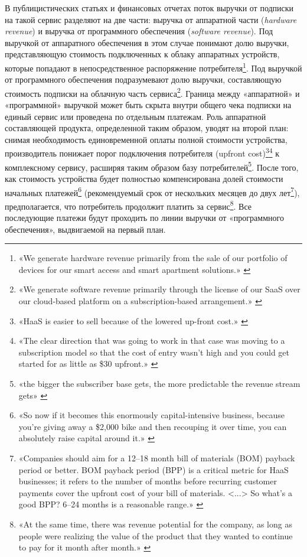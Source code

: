 \documentclass{article}
\let\textitorig\textit
\renewcommand{\textit}[1]{{\fontfamily{cmr}\selectfont \textitorig{#1}}}
\begin{document}
В публицистических статьях и финансовых отчетах поток выручки от подписки на такой сервис разделяют на две части: выручка от аппаратной части (\textit{hardware revenue}) и выручка от программного обеспечения (\textit{software revenue}). Под выручкой от аппаратного обеспечения в этом случае понимают долю выручки, представляющую стоимость подключенных к облаку аппаратных устройств, которые попадают в непосредственное распоряжение потребителя\footnote{«We generate hardware revenue primarily from the sale of our portfolio of devices for our smart access and smart apartment solutions.» \cite{latch10K2023}}. Под выручкой от программного обеспечения подразумевают долю выручки, составляющую стоимость подписки на облачную часть сервиса\footnote{«We generate software revenue primarily through the license of our SaaS over our cloud-based platform on a subscription-based arrangement.» \cite{latch10K2023}}. Граница между «аппаратной» и «программной» выручкой может быть скрыта внутри общего чека подписки на единый сервис или проведена по отдельным платежам. Роль аппаратной составляющей продукта, определенной таким образом, уводят на второй план: снимая необходимость единовременной оплаты полной стоимости устройства, производитель понижает порог подключения потребителя (upfront cost)\footnote{«HaaS is easier to sell because of the lowered up-front cost.» \cite{howHaasWillSaveIot2016}}\footnote{«The clear direction that was going to work in that case was moving to a subscription model so that the cost of entry wasn’t high and you could get started for as little as \$30 upfront.» \cite{robbiekellmanbaxterBenFosterWhoop2022}} к комплексному сервису, расширяя таким образом базу потребителей\footnote{«the bigger the subscriber base gets, the more predictable the revenue stream gets» \cite{nyTimesPeloton2022}}. После того, как стоимость устройства будет полностью компенсирована долей стоимости начальных платежей\footnote{«So now if it becomes this enormously capital-intensive business, because you’re giving away a \$2,000 bike and then recouping it over time, you can absolutely raise capital around it.» \cite{nyTimesPeloton2022}} (рекомендуемый срок от нескольких месяцев до двух лет\footnote{«Companies should aim for a 12–18 month bill of materials (BOM) payback period or better. BOM payback period (BPP) is a critical metric for HaaS businesses; it refers to the number of months before recurring customer payments cover the upfront cost of your bill of materials. <...> So what’s a good BPP? 6–24 months is a reasonable range.» \cite{hardfinHaasPricingPlans2023}}), предполагается, что потребитель продолжит платить за сервис\footnote{«At the same time, there was revenue potential for the company, as long as people were realizing the value of the product that they wanted to continue to pay for it month after month.» \cite{robbiekellmanbaxterBenFosterWhoop2022}}. Все последующие платежи будут проходить по линии выручки от «программного обеспечения», выдвигаемой на первый план.
\end{document}

